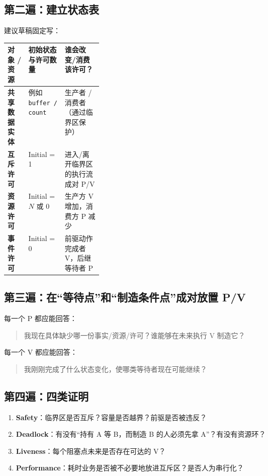 \documentclass[11pt,a4paper]{ctexart}
\newcommand{\kw}[1]{\textbf{#1}}
\newcommand{\code}[1]{\texttt{#1}}
\begin{document}
\subsection{第二遍：建立状态表}

建议草稿固定写：

\begingroup
\small
\renewcommand{\arraystretch}{1.25}
\setlength{\tabcolsep}{6pt}
\begin{tabularx}{\linewidth}{>{\bfseries}p{0.22\linewidth} X X}
\toprule
对象 / 资源 & 初始状态与许可数量 & 谁会改变/消费该许可？\\
\midrule
共享数据实体 & 例如 \code{buffer / count} & 生产者 / 消费者（通过临界区保护）\\
互斥许可 & Initial = 1 & 进入/离开临界区的执行流成对 P/V\\
资源许可 & Initial = $N$ 或 $0$ & 生产方 V 增加，消费方 P 减少\\
事件许可 & Initial = 0 & 前驱动作完成者 V，后继等待者 P\\
\bottomrule
\end{tabularx}
\endgroup

\subsection{第三遍：在“等待点”和“制造条件点”成对放置 P/V}

每一个 P 都应能回答：
\begin{quote}
我现在具体缺少哪一份事实/资源/许可？谁能够在未来执行 V 制造它？
\end{quote}
每一个 V 都应能回答：
\begin{quote}
我刚刚完成了什么状态变化，使哪类等待者现在可能继续？
\end{quote}

\subsection{第四遍：四类证明}

\begin{enumerate}
\item \kw{Safety}：临界区是否互斥？容量是否越界？前驱是否被违反？
\item \kw{Deadlock}：有没有“持有 A 等 B，而制造 B 的人必须先拿 A”？有没有资源环？
\item \kw{Liveness}：每个阻塞点未来是否存在可达的 V？
\item \kw{Performance}：耗时业务是否被不必要地放进互斥区？是否人为串行化？
\end{enumerate}
\end{document}
